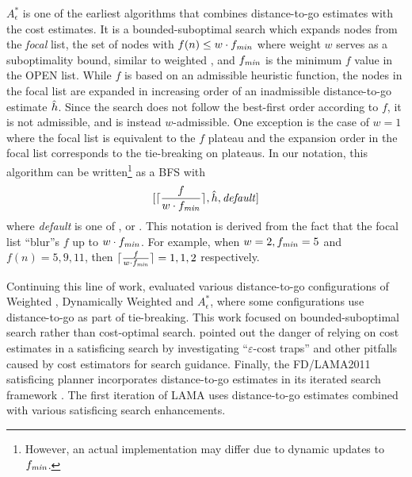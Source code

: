 $A^*_\epsilon$ \cite{pearl1982studies} is one of
the earliest algorithms that combines distance-to-go estimates with the cost estimates. It is a bounded-suboptimal
search which expands nodes from the \emph{focal} list, the set of nodes with $f(n)\leq w\cdot f_{\mit{min}}$ where weight $w$ serves as a suboptimality bound, similar to weighted \astar, 
 and $f_{\mit{min}}$ is the minimum $f$ value in the OPEN list.  While $f$
is based on an admissible heuristic function, the nodes in the focal list are expanded in increasing order of
an inadmissible distance-to-go estimate $\hh$. Since the search does not follow the best-first order according to $f$, it is 
not admissible, and is instead $w$-admissible. One exception is the case of $w=1$ where the focal list is equivalent
to the $f$ plateau and the expansion order in the focal list corresponds to the tie-breaking on plateaus. In our
notation, this algorithm can be written\footnote{
However, an actual implementation may differ due to dynamic updates to $f_{\mit{min}}$.}
as a BFS with
\[
 [ \lceil \frac{f}{w\cdot f_{\mit{min}}} \rceil, \hh, \mit{default}]
\]
where \textit{default} is one of \fifo, \lifo or \ro.
This notation is derived from the fact that the focal list ``blur''s $f$ up to $w\cdot f_{\mit{min}}$.
For example, when $w=2, f_{\mit{min}}=5$ and
$f(n)=5,9,11$, then $\lceil \frac{f}{w\cdot f_{\mit{min}}} \rceil=1,1,2$ respectively. 

Continuing this line of work,  \citeyear{thayer2009using,thayer2011bounded}
evaluated various distance-to-go configurations of Weighted
\astar, Dynamically Weighted \astar \cite{pohl1973avoidance} and $A^*_\epsilon$, where
some configurations use distance-to-go as part of
tie-breaking. This work focused on bounded-suboptimal search rather than cost-optimal search.
% 
 \citeyear{cushing2010cost} pointed out the danger of relying  %
on cost estimates in a satisficing search by investigating ``$\varepsilon$-cost traps'' and other pitfalls caused by
cost estimators for search guidance. %
% 
Finally, %
the FD/LAMA2011 satisficing planner incorporates distance-to-go estimates in its iterated search
framework \cite{richter2011lama}. The first iteration of LAMA uses distance-to-go estimates combined with various satisficing
search enhancements.

